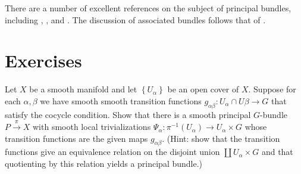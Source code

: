 There are a number of excellent references on the subject of principal bundles, including \cite{KN}, \cite{Spivak},
and \cite{Naber1}. The discussion of associated bundles follows that of \cite{Naber1}.

\section{Exercises}

\begin{exc}
    \label{exc:bundleconst}
    Let $X$ be a smooth manifold and let $\left\{ U_\alpha \right\}$ be an open cover of $X$. Suppose for each
    $\alpha,\beta$ we have smooth smooth transition functions $g_{\alpha\beta}:U_\alpha\cap U\beta\to G$ that
    satisfy the cocycle condition. Show that there is a smooth principal $G$-bundle $P\xrightarrow{\pi} X$ with smooth local
    trivializations $\Psi_\alpha:\pi^{-1}(U_\alpha)\to U_\alpha\times G$ whose transition functions are the given maps
    $g_{\alpha\beta}$. (Hint: show that the transition functions give an equivalence relation on the disjoint union
    $\coprod U_\alpha\times G$ and that quotienting by this relation yields a principal bundle.)
\end{exc}

